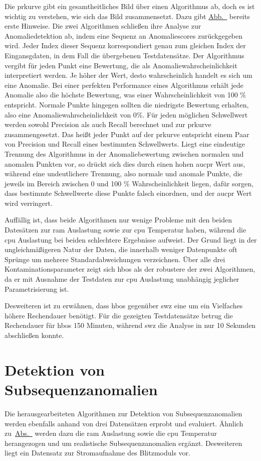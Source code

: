 Die \ac{prkurve} gibt ein gesamtheitliches Bild über einen Algorithmus ab, doch es ist wichtig zu verstehen, wie sich das Bild zusammensetzt. Dazu gibt
\hyperref[fig:auc_pr_beispiel]{Abb.~} bereits erste Hinweise. Die zwei Algorithmen schließen ihre Analyse zur Anomaliedetektion
ab, indem eine Sequenz an Anomaliescores zurückgegeben wird. Jeder Index dieser Sequenz korrespondiert genau zum gleichen Index der Eingansgdaten, in dem Fall
die übergebenen Testdatensätze. Der Algorithmus vergibt für jeden Punkt eine Bewertung, die als Anomaliewahrscheinlichkeit interpretiert werden. Je
höher der Wert, desto wahrscheinlich handelt es sich um eine Anomalie. Bei einer perfekten Performance eines Algorithmus erhält jede Anomalie also die
höchste Bewertung, was einer Wahrscheinlichkeit von 100 \% entspricht. Normale Punkte hingegen sollten die niedrigste Bewertung erhalten, also eine
Anomaliewahrscheinlichkeit von 0\%. Für jeden möglichen Schwellwert werden sowohl Precision als auch Recall berechnet und zur \ac{prkurve} zusammengesetzt.
Das heißt jeder Punkt auf der \ac{prkurve} entspricht einem Paar von Precision und Recall eines bestimmten Schwellwerts.
Liegt eine eindeutige Trennung des Algorithmus in der Anomaliebewertung zwischen normalen und anomalen Punkten vor, so drückt sich dies durch einen
hohen \ac{aucpr} Wert aus, während eine undeutlichere Trennung, also normale und anomale Punkte, die jeweils im Bereich zwischen 0 und 100 \% Wahrscheinlichkeit
liegen, dafür sorgen, dass bestimmte Schwellwerte diese Punkte falsch einordnen, und der \ac{aucpr} Wert wird verringert.

Auffällig ist, dass beide Algorithmen nur wenige Probleme mit den beiden Datesätzen zur \ac{ram} Auslastung sowie zur \ac{cpu} Temperatur haben, während
die \ac{cpu} Auslastung bei beiden schlechtere Ergebnisse aufweist. Der Grund liegt in der ungleichmäßigeren Natur der Daten, die innerhalb weniger
Datenpunkte oft Sprünge um mehrere Standardabweichungen verzeichnen. Über alle drei Kontaminationsparameter zeigt sich \ac{hbos} als der robustere
der zwei Algorithmen, da er mit Ausnahme der Testdaten zur \ac{cpu} Auslastung unabhängig jeglicher Parametrisierung ist.

Desweiteren ist zu erwähnen, dass \ac{hbos} gegenüber \ac{swz} eine um ein Vielfaches höhere Rechendauer benötigt. Für die gezeigten Testdatensätze
betrug die Rechendauer für \ac{hbos} 150 Minuten, während \ac{swz} die Analyse in nur 10 Sekunden abschließen konnte.

\section{Detektion von Subsequenzanomalien}
Die herausgearbeiteten Algorithmen zur Detektion von Subsequenzanomalien werden ebenfalls anhand von drei Datensätzen erprobt und evaluiert.
Ähnlich zu~\hyperref[sec:punktanomaliedetektion]{Abs.~} werden dazu die \ac{ram} Auslastung sowie die \ac{cpu} Temperatur
herangezogen und um realistische Subsequenzanomalien ergänzt. Desweiteren liegt ein Datensatz zur Stromaufnahme des Blitzmoduls vor.

